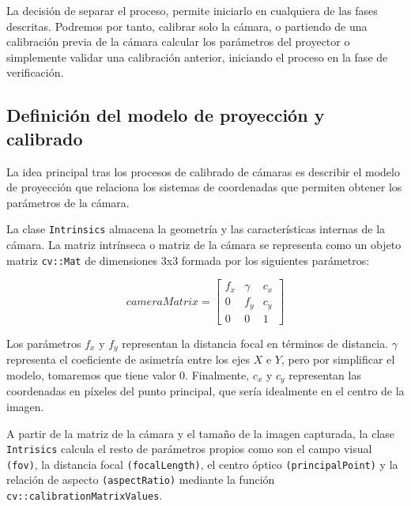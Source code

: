 La decisión de separar el proceso, permite iniciarlo en cualquiera de las fases descritas. Podremos por tanto, calibrar solo la cámara, o partiendo de una calibración previa de la cámara calcular los parámetros del proyector o simplemente validar una calibración anterior, iniciando el proceso en la fase de verificación.  


\subsection{Definición del modelo de proyección y calibrado}
La idea principal tras los procesos de calibrado de cámaras es describir el modelo de proyección que relaciona los sistemas de coordenadas que permiten obtener los parámetros de la cámara. 

La clase \texttt{Intrinsics} almacena la geometría y las características internas de la cámara. La matriz intrínseca o matriz de la cámara se representa como un objeto matriz \texttt{cv::Mat} de dimensiones 3x3 formada por los siguientes parámetros:

\begin{equation}
cameraMatrix=
\begin{bmatrix}
f_{x} & \gamma & c_{x} \\
0    & f_{y}   & c_{y} \\
0    & 0      & 1
\end{bmatrix}
\end{equation}

Los parámetros $f_{x}$ y $f_{y}$ representan la distancia focal en términos de distancia. $\gamma$ representa el coeficiente de asimetría entre los ejes $X$ e $Y$, pero por simplificar el modelo, tomaremos que tiene valor 0. Finalmente, $c_{x}$ y $c_{y}$ representan las coordenadas en píxeles del punto principal, que sería idealmente en el centro de la imagen.

A partir de la matriz de la cámara y el tamaño de la imagen capturada, la clase \texttt{Intrisics} calcula el resto de parámetros propios como son el campo visual \texttt{(fov)}, la distancia focal \texttt{(focalLength)}, el centro óptico \texttt{(principalPoint)} y la relación de aspecto \texttt{(aspectRatio)} mediante la función \texttt{cv::calibrationMatrixValues}. 

